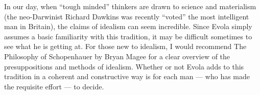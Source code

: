 In our day, when “tough minded” thinkers are drawn to science and materialism (the neo-Darwinist Richard Dawkins was
recently “voted” the most intelligent man in Britain), the claims of idealism can seem incredible. Since Evola simply
assumes a basic familiarity with this tradition, it may be difficult sometimes to see what he is getting at. For those
new to idealism, I would recommend The Philosophy of Schopenhauer by Bryan Magee for a clear overview of the
presuppositions and methods of idealism. Whether or not Evola adds to this tradition in a coherent and constructive way
is for each man — who has made the requisite effort — to decide.

